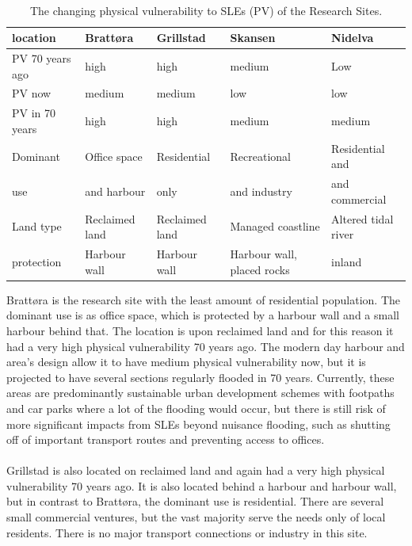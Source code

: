 \paragraph{}
\begin{table}[!ht]
    \centering
    \begin{tabular}{|l|l|l|l|l|}
    \hline
        location & Brattøra & Grillstad & Skansen  & Nidelva \\ \hline
        PV 70 years ago & high & high & medium & Low \\ \hline
        PV now &  medium &  medium &  low &  low \\ \hline
        PV in 70 years &  high &  high &  medium &  medium \\ \hline
        Dominant & Office space  & Residential & Recreational  & Residential and \\ \newline
        use & and harbour &  only   &  and industry & and commercial  \\ \hline
        Land type & Reclaimed land & Reclaimed land & Managed coastline  & Altered tidal river \\ \hline
        protection & Harbour wall & Harbour wall & Harbour wall, placed rocks & inland \\ \hline
    \end{tabular}
    \caption{The changing physical vulnerability to SLEs (PV) of the Research Sites.}
    \label{table:research-sites}
\end{table}

Brattøra is the research site with the least amount of residential population. The dominant use is as office space, which is protected by a harbour wall and a small harbour behind that. The location is upon reclaimed land and for this reason it had a very high physical vulnerability 70 years ago. The modern day harbour and area's design allow it to have medium physical vulnerability now, but it is projected to have several sections regularly flooded in 70 years. Currently, these areas are predominantly sustainable urban development schemes with footpaths and car parks where a lot of the flooding would occur, but there is still risk of more significant impacts from SLEs beyond nuisance flooding, such as shutting off of important transport routes and preventing access to offices.
\paragraph{}
Grillstad is also located on reclaimed land and again had a very high physical vulnerability 70 years ago. It is also located behind a harbour and harbour wall, but in contrast to  Brattøra, the dominant use is residential. There are several small commercial ventures, but the vast majority serve the needs only of local residents. There is no major transport connections or industry in this site. 
